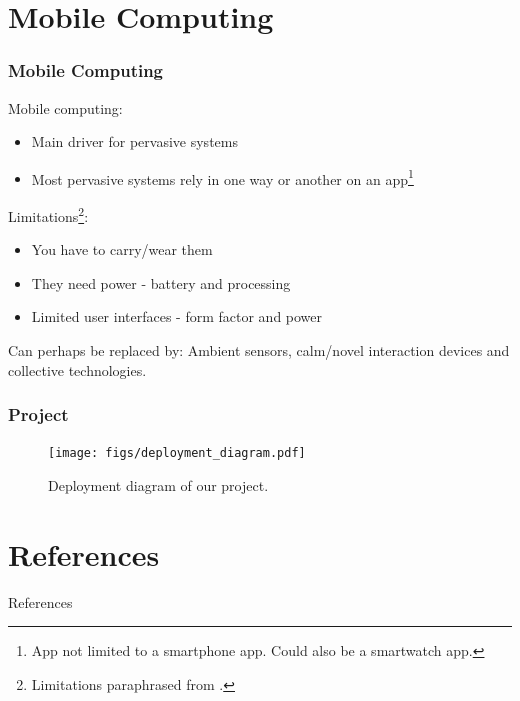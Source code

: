 \documentclass[10pt]{beamer}
\begin{document}
\section{Mobile Computing}

\begin{frame}
  \frametitle{Mobile Computing}
  Mobile computing:
  \vspace*{-1em}
  \begin{itemize}
    \item Main driver for pervasive systems
    \item Most pervasive systems rely in one way or another on an app\footnote{App not limited to a smartphone app. Could also be a smartwatch app.}
  \end{itemize}

  Limitations\footnote{Limitations paraphrased from \cite{wagnerPervasiveComputing2022}.}:
  \vspace*{-1em}
  \begin{itemize}
    \item You have to carry/wear them
    \item They need power - battery and processing
    \item Limited user interfaces - form factor and power
  \end{itemize}

  Can perhaps be replaced by: Ambient sensors, calm/novel interaction devices and collective technologies.
\end{frame}

\begin{frame}
  \frametitle{Project}
  \begin{figure}
    \texttt{[image: figs/deployment\_diagram.pdf]}
    \caption{Deployment diagram of our project.}
  \end{figure}
\end{frame}

\section{References}
\begin{frame}[allowframebreaks]{References}
  
  
\end{frame}
\end{document}
